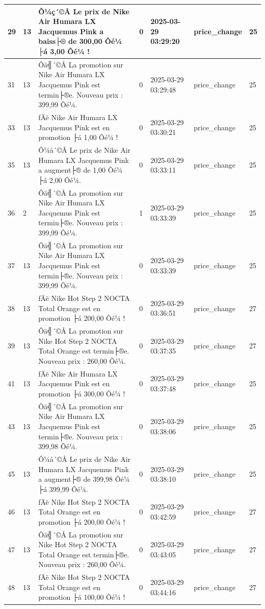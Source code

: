 \begin{longtable}{|l|l|l|l|l|l|l|}
29 & 13 & Ô¼ç´©Å Le prix de Nike Air Humara LX Jacquemus Pink a baiss├® de 300,00 Ôé¼ ├á 3,00 Ôé¼ ! & 0 & 2025-03-29 03:29:20 & price\_change & 25 \\ \hline 
31 & 13 & Ôä╣´©Å La promotion sur Nike Air Humara LX Jacquemus Pink est termin├®e. Nouveau prix : 399,99 Ôé¼. & 0 & 2025-03-29 03:29:48 & price\_change & 25 \\ \hline 
33 & 13 & ­ƒÄë Nike Air Humara LX Jacquemus Pink est en promotion ├á 1,00 Ôé¼ ! & 0 & 2025-03-29 03:30:21 & price\_change & 25 \\ \hline 
35 & 13 & Ô¼å´©Å Le prix de Nike Air Humara LX Jacquemus Pink a augment├® de 1,00 Ôé¼ ├á 2,00 Ôé¼. & 0 & 2025-03-29 03:33:11 & price\_change & 25 \\ \hline 
36 & 2 & Ôä╣´©Å La promotion sur Nike Air Humara LX Jacquemus Pink est termin├®e. Nouveau prix : 399,99 Ôé¼. & 1 & 2025-03-29 03:33:39 & price\_change & 25 \\ \hline 
37 & 13 & Ôä╣´©Å La promotion sur Nike Air Humara LX Jacquemus Pink est termin├®e. Nouveau prix : 399,99 Ôé¼. & 0 & 2025-03-29 03:33:39 & price\_change & 25 \\ \hline 
38 & 13 & ­ƒÄë Nike Hot Step 2 NOCTA Total Orange est en promotion ├á 200,00 Ôé¼ ! & 0 & 2025-03-29 03:36:51 & price\_change & 27 \\ \hline 
39 & 13 & Ôä╣´©Å La promotion sur Nike Hot Step 2 NOCTA Total Orange est termin├®e. Nouveau prix : 260,00 Ôé¼. & 0 & 2025-03-29 03:37:35 & price\_change & 27 \\ \hline 
41 & 13 & ­ƒÄë Nike Air Humara LX Jacquemus Pink est en promotion ├á 300,00 Ôé¼ ! & 0 & 2025-03-29 03:37:48 & price\_change & 25 \\ \hline 
43 & 13 & Ôä╣´©Å La promotion sur Nike Air Humara LX Jacquemus Pink est termin├®e. Nouveau prix : 399,98 Ôé¼. & 0 & 2025-03-29 03:38:06 & price\_change & 25 \\ \hline 
45 & 13 & Ô¼å´©Å Le prix de Nike Air Humara LX Jacquemus Pink a augment├® de 399,98 Ôé¼ ├á 399,99 Ôé¼. & 0 & 2025-03-29 03:38:10 & price\_change & 25 \\ \hline 
46 & 13 & ­ƒÄë Nike Hot Step 2 NOCTA Total Orange est en promotion ├á 200,00 Ôé¼ ! & 0 & 2025-03-29 03:42:59 & price\_change & 27 \\ \hline 
47 & 13 & Ôä╣´©Å La promotion sur Nike Hot Step 2 NOCTA Total Orange est termin├®e. Nouveau prix : 260,00 Ôé¼. & 0 & 2025-03-29 03:43:05 & price\_change & 27 \\ \hline 
48 & 13 & ­ƒÄë Nike Hot Step 2 NOCTA Total Orange est en promotion ├á 100,00 Ôé¼ ! & 0 & 2025-03-29 03:44:16 & price\_change & 27 \\ \hline 

\end{longtable}
